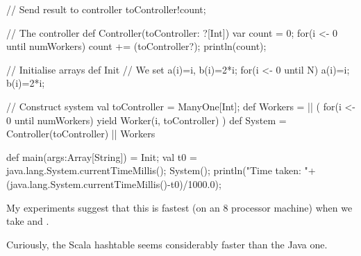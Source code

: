 \begin{answer}
\begin{scala}
{{    // Send result to controller
    toController!count;
  }

  // The controller
  def Controller(toController: ?[Int]){
    var count = 0;
    for(i <- 0 until numWorkers) count += (toController?);
    println(count);
  }

  // Initialise arrays
  def Init{
    // We set a(i)=i, b(i)=2*i;
    for(i <- 0 until N){ a(i)=i; b(i)=2*i; }
  }

  // Construct system
  val toController = ManyOne[Int];
  def Workers =
    || ( for(i <- 0 until numWorkers) yield 
           Worker(i, toController) )
  def System = Controller(toController) || Workers

  def main(args:Array[String]) = {
    Init; 
    val t0 = java.lang.System.currentTimeMillis();
    System();
    println("Time taken: "+
      (java.lang.System.currentTimeMillis()-t0)/1000.0);
  }
}
\end{scala}

My experiments suggest that this is fastest (on an 8 processor machine) when
we take  and .

Curiously, the Scala hashtable seems considerably faster than the Java one. 
\end{answer}
